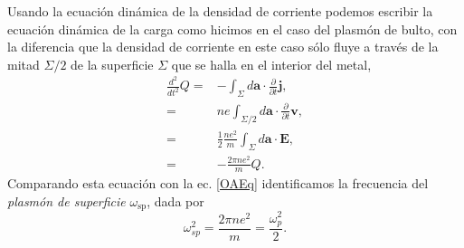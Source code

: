 \documentclass[12pt]{article}
\begin{document}
Usando la ecuación dinámica de la densidad de corriente podemos
escribir la ecuación dinámica de la carga como hicimos en el caso del
plasmón de bulto, con la diferencia que la densidad de corriente en
este caso sólo fluye a través de la mitad $\Sigma/2$ de la superficie $\Sigma $
que se halla en el interior del metal,
\begin{equation}
  \begin{split}
    \frac{d^{2}}{dt^{2}}Q = & -\int_{\Sigma}d\bm{a}\cdot\frac{\partial}{\partial t}\bm{j},\\
    = & ne \int_{\Sigma/2}d\bm{a}\cdot\frac{\partial}{\partial t}\bm{v},\\
    = & \frac{1}{2}\frac{ne^{2}}{m}\int_{\Sigma}d\bm{a}\cdot \bm{E}, \\
    = & -\frac{2\pi ne^{2}}{m}Q.
  \end{split}
\end{equation}
Comparando esta ecuación con la ec. \eqref{OAEq} identificamos la
frecuencia del {\em plasmón de superficie} $\omega_{\text{sp}}$, dada
por
\begin{equation}
  \omega_{sp}^{2}=\frac{2\pi ne^{2}}{m} = \frac{\omega_{p}^{2}}{2}.
  \label{surfaceplasmonfrecuency}
\end{equation}
\end{document}
